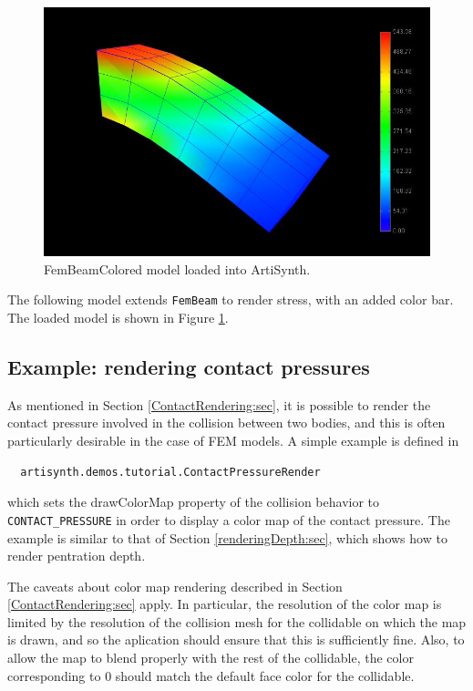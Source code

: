 \begin{figure}[ht]
	\centering
	\includegraphics[width=\imglength]{images/FemBeamColored}
	\caption{FemBeamColored model loaded into ArtiSynth.}
	\label{fig:fem:beamcolored}
\end{figure}

The following model extends {\tt FemBeam} to render stress, with an added 
color bar.  The loaded model is shown in Figure \ref{fig:fem:beamcolored}.
\lstset{numbers=left}

\lstset{numbers=none}

\subsection{Example: rendering contact pressures}
\label{renderingContactPressure:sec}

As mentioned in Section \ref{ContactRendering:sec}, it is possible to
render the contact pressure involved in the collision between two
bodies, and this is often particularly desirable in the case of FEM
models. A simple example is defined in
%
\begin{verbatim}
  artisynth.demos.tutorial.ContactPressureRender
\end{verbatim}
%
which sets the {\sf drawColorMap} property of the collision behavior to {\tt
CONTACT\_PRESSURE} in order to display a color map of the contact
pressure. The example is similar to that
of Section \ref{renderingDepth:sec}, which shows how to render
pentration depth.

\begin{sideblock}
The caveats about color map rendering described in Section
\ref{ContactRendering:sec} apply. In particular, the resolution of the
color map is limited by the resolution of the collision mesh for the
collidable on which the map is drawn, and so the aplication should
ensure that this is sufficiently fine. Also, to allow the map to blend
properly with the rest of the collidable, the color corresponding to
$0$ should match the default face color for the collidable.
\end{sideblock}

